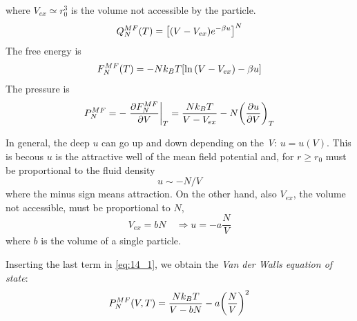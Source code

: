 \documentclass[../main/main.tex]{subfiles}
\begin{document}
where \( V_{ex} \simeq r_0^3 \) is the volume not accessible by the particle.
\begin{equation}
  Q_N^{MF} (T) = \qty[ (V-V_{ex})e^{-\beta u} ]^N
\end{equation}
The free energy is
\begin{equation}
  F_N^{MF} (T) = - N k_B T \qty[ \ln{(V-V_{ex})} - \beta u ]
\end{equation}
The pressure is
\begin{equation}
  P_N^{MF} = - \eval{\pdv{F_N^{MF}}{V} }_T = \frac{N k_B T}{V-V_{ex}} - N \qty(\pdv{u}{V} )_T
  \label{eq:14_1}
\end{equation}
\begin{remark}
In general, the deep \( u \)  can go up and down depending on the \emph{V}: \( u = u (V) \). This is becous \( u \) is the attractive well of the mean field potential and, for \( r \ge r_0 \) must be proportional to the fluid density
\begin{equation*}
  u \sim -N/V
\end{equation*}
where the minus sign means attraction. On the other hand, also \( V_{ex} \), the volume not accessible, must be proportional to \( N \),
\begin{equation*}
  V_{ex} = b N  \quad  \Rightarrow u = - a \frac{N}{V}
\end{equation*}
where \( b \) is the volume of a single particle.
\end{remark}
Inserting the last term in \eqref{eq:14_1}, we obtain the \emph{Van der Walls equation of state}:
\begin{equation}
  P_N^{MF} (V,T) = \frac{N k_B T}{V-bN} - a \qty(\frac{N}{V})^2
  \label{eq:14_2}
\end{equation}
\end{document}
